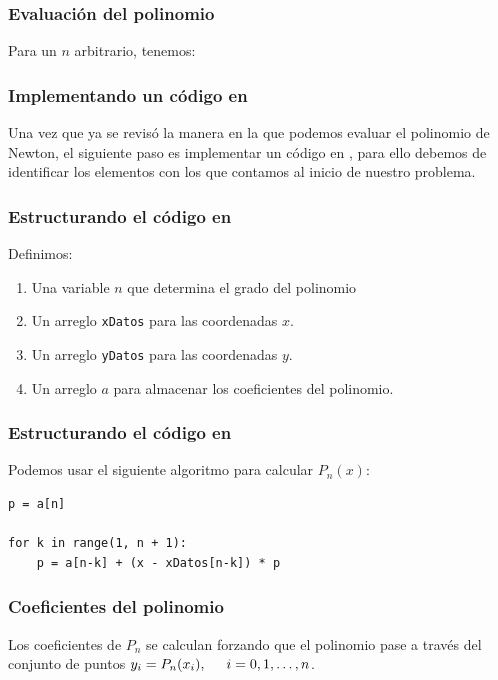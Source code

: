 \documentclass[12pt]{beamer}
\begin{document}
\begin{frame}
\frametitle{Evaluación del polinomio}
Para un $n$ arbitrario, tenemos:
\pause
{}
\end{frame}
\begin{frame}
\frametitle{Implementando un código en \python}
Una vez que ya se revisó la manera en la que podemos evaluar el polinomio de Newton, el siguiente paso es implementar un código en \python, para ello debemos de identificar los elementos con los que contamos al inicio de nuestro problema.
\end{frame}
\begin{frame}[fragile]
\frametitle{Estructurando el código en \python}
Definimos:
\begin{enumerate}[<+->]
\item Una variable $n$ que determina el grado del polinomio 
\item Un arreglo \texttt{xDatos} para las coordenadas $x$.
\item Un arreglo \texttt{yDatos} para las coordenadas $y$.
\item Un arreglo $a$ para almacenar los coeficientes del polinomio.
\end{enumerate}
\end{frame}
\begin{frame}[fragile]
\frametitle{Estructurando el código en \python}
Podemos usar el siguiente algoritmo para calcular $P_{n} (x)$:
\begin{lstlisting}[caption=Algoritmo para calcular $P_{n}$]
p = a[n]

for k in range(1, n + 1):
    p = a[n-k] + (x - xDatos[n-k]) * p
\end{lstlisting}
\end{frame}
\begin{frame}
\frametitle{Coeficientes del polinomio}
Los coeficientes de $P_{n}$ se calculan forzando que el polinomio pase a través del conjunto de puntos $y_{i} = P_{n} (x_{i}),\hspace{0.5cm} i = 0, 1, \ldots, n$. 
\end{frame}
\end{document}
